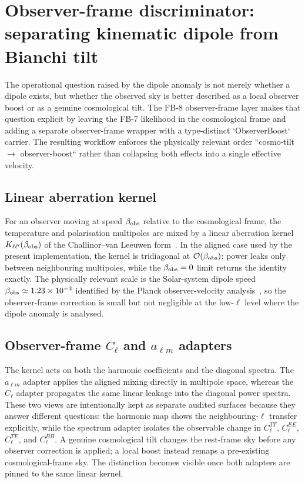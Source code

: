 \section{Observer-frame discriminator: separating kinematic dipole from Bianchi tilt}
\label{sec:dipole-discriminator}

The operational question raised by the dipole anomaly is not
merely whether a dipole exists, but whether the observed sky is
better described as a local observer boost or as a genuine
cosmological tilt.  The FB-8 observer-frame layer makes that
question explicit by leaving the FB-7 likelihood in the
cosmological frame and adding a separate observer-frame wrapper
with a type-distinct `ObserverBoost` carrier.  The resulting
workflow enforces the physically relevant order
``cosmo-tilt $\rightarrow$ observer-boost`` rather than
collapsing both effects into a single effective velocity.


\subsection{Linear aberration kernel}

For an observer moving at speed $\beta_{\rm obs}$ relative to
the cosmological frame, the temperature and polarisation
multipoles are mixed by a linear aberration kernel
$K_{\ell\ell'}(\beta_{\rm obs})$ of the
Challinor--van Leeuwen form~\cite{ChallinorVanLeeuwen2002}.  In
the aligned case used by the present implementation, the kernel
is tridiagonal at ${\cal O}(\beta_{\rm obs})$: power leaks only
between neighbouring multipoles, while the
$\beta_{\rm obs} = 0$ limit returns the identity exactly.  The
physically relevant scale is the Solar-system dipole speed
$\beta_{\rm obs} \simeq 1.23\times 10^{-3}$ identified by the
Planck observer-velocity analysis~\cite{Planck2013XXVII}, so the
observer-frame correction is small but not negligible at the
low-$\ell$ level where the dipole anomaly is analysed.


\subsection{Observer-frame $C_\ell$ and $a_{\ell m}$ adapters}

The kernel acts on both the harmonic coefficients and the
diagonal spectra.  The $a_{\ell m}$ adapter applies the aligned
mixing directly in multipole space, whereas the $C_\ell$
adapter propagates the same linear leakage into the diagonal
power spectra.  These two views are intentionally kept as
separate audited surfaces because they answer different
questions: the harmonic map shows the neighbouring-$\ell$
transfer explicitly, while the spectrum adapter isolates the
observable change in $C_\ell^{TT}$, $C_\ell^{EE}$,
$C_\ell^{TE}$, and $C_\ell^{BB}$.  A genuine cosmological tilt
changes the rest-frame sky before any observer correction is
applied; a local boost instead remaps a pre-existing
cosmological-frame sky.  The distinction becomes visible once
both adapters are pinned to the same linear kernel.


